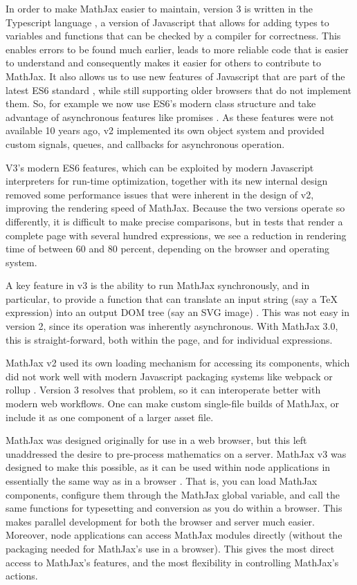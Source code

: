 \documentclass[11pt]{article} %
\begin{document}
In order to make MathJax easier to maintain, version 3 is written in the
Typescript language \cite{Typescript}, a version of Javascript that allows for
adding types to variables and functions that can be checked by a compiler for
correctness.  This enables errors to be found much earlier, leads to more
reliable code that is easier to understand and consequently makes it easier for
others to contribute to MathJax.  It also allows us to use new features of
Javascript that are part of the latest ES6 standard \cite{ES6}, while still
supporting older browsers that do not implement them.
So, for example we now use ES6's modern class structure \cite{ES6-class}
and take advantage of asynchronous features like promises \cite{ES6-promise}.
As these features were not available 10 years ago, v2 implemented its
own object system and provided custom signals, queues, and callbacks
for asynchronous operation.

V3's modern ES6 features, which can be exploited by modern Javascript
interpreters for run-time optimization, together with its new internal
design removed some performance issues that were inherent in the
design of v2, improving the rendering speed of MathJax.  Because the
two versions operate so differently, it is difficult to make precise
comparisons, but in tests that render a complete page with several
hundred expressions, we see a reduction in rendering time of between
60 and 80 percent, depending on the browser and operating system.

A key feature in v3 is the ability to run MathJax synchronously, and
in particular, to provide a function that can translate an input
string (say a TeX expression) into an output DOM tree (say an SVG
image) \cite{MJ-convert}. This was not easy in version 2, since its
operation was inherently asynchronous. With MathJax 3.0, this is
straight-forward, both within the page, and for individual
expressions.

MathJax v2 used its own loading mechanism for accessing its
components, which did not work well with modern Javascript packaging systems
like webpack \cite{webpack} or rollup \cite{rollup}.  Version 3
resolves that problem, so it can interoperate better with modern web
workflows. One can make custom single-file builds of MathJax, or
include it as one component of a larger asset file.

MathJax was designed originally for use in a web browser, but this
left unaddressed the desire to pre-process mathematics on a
server. MathJax v3 was designed to make this possible, as it can be
used within node applications in essentially the same way as in a
browser \cite{MJ-web, MJ-node}. That is, you can load MathJax
components, configure them through the MathJax global variable, and
call the same functions for typesetting and conversion as you do
within a browser. This makes parallel development for both the browser
and server much easier.  Moreover, node applications can access
MathJax modules directly (without the packaging needed for MathJax's
use in a browser). This gives the most direct access to MathJax’s
features, and the most flexibility in controlling MathJax’s actions.
\end{document}
